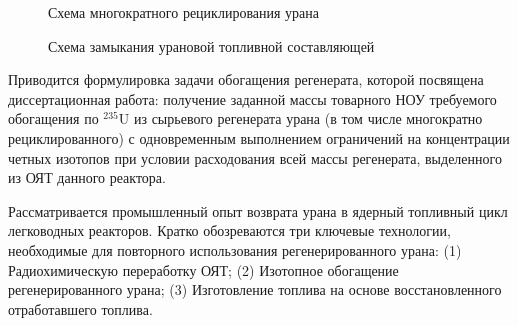 \begin{figure}[ht]
  \caption{Схема многократного рециклирования урана}\label{fig_autoref1}
\end{figure}

\begin{figure}[ht]
  \caption{Схема замыкания урановой топливной составляющей}\label{fig_autoref2}
\end{figure}


Приводится формулировка задачи обогащения регенерата, которой посвящена диссертационная работа: получение заданной массы товарного НОУ требуемого обогащения по $^{235}$U из сырьевого регенерата урана (в том числе многократно рециклированного) с одновременным выполнением ограничений на концентрации четных изотопов при условии расходования всей массы реге­нерата, выделенного из ОЯТ данного реактора.

Рассматривается промышленный опыт возврата урана в ядерный топливный цикл легководных реакторов. Кратко обозреваются три ключевые технологии, необходимые для повторного использования регенерированного урана:
(1) Радиохимическую переработку ОЯТ; (2) Изотопное обогащение регенерированного урана; (3) Изготовление топлива на основе восстановленного отработавшего топлива.

